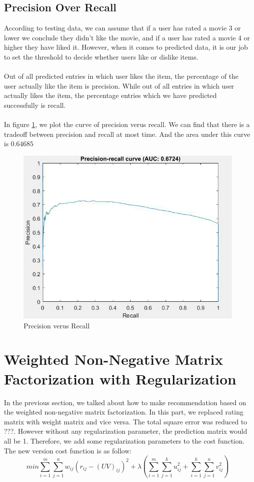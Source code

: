 \documentclass{article}
\begin{document}
\subsection{Precision Over Recall}
According to testing data, we can assume that if a user has rated a movie 3 or lower we conclude they didn't like the movie, and if a user has rated a movie 4 or higher they have liked it. However, when it comes to predicted data, it is our job to set the threshold to decide whether users like or dislike items.\\
\\
Out of all predicted entries in which user likes the item, the percentage of the user actually like the item is precision. While out of all entries in which user actually likes the item, the percentage entries which we have predicted successfully is recall.\\
\\
In figure \ref{fig:problem3}, we plot the curve of precision verus recall. We can find that there is a tradeoff between precision and recall at most time. And the area under this curve is $0.64685$
\begin{figure}[htbp]
\centering
\includegraphics[width=.6\textwidth]{problem3.jpg}
\caption{Precision verus Recall}
\label{fig:problem3}
\end{figure}

\section{Weighted Non-Negative Matrix Factorization with Regularization}
In the previous section, we talked about how to make recommendation based on the weighted non-negative matrix factorization. In this part, we replaced rating matrix with weight matrix and vice versa. The total square error was reduced to ???. However without any regularization parameter, the prediction matrix would all be 1. Therefore, we add some regularization parameters to the cost function. The new version cost function is as follow:
\begin{equation*}
min\sum_{i=1}^{m}\sum_{j=1}^{n}w_{ij}{(r_{ij}-{(UV)}_{ij})}^2 + \lambda\left( \sum_{i=1}^m\sum_{j=1}^ku_{ij}^2+\sum_{i=1}^k\sum_{j=1}^nv_{ij}^2\right) 
\end{equation*}
\end{document}
